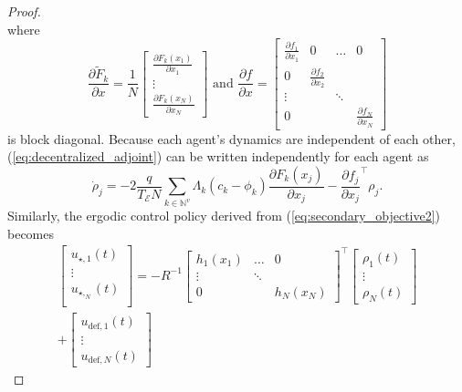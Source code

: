 \documentclass[letterpaper, 10 pt, conference]{ieeeconf}  %
\begin{document}
\begin{proof}
\begin{equation}
\end{equation}
where 
\begin{equation*}
\frac{\partial \tilde{F}_k}{\partial x} = \frac{1}{N} \begin{bmatrix}
\frac{\partial F_k (x_1)}{\partial x_1} \\
\vdots \\
\frac{\partial F_k(x_N)}{\partial x_N}
\end{bmatrix} 
\text{ and }
\frac{\partial f}{\partial x} =
\begin{bmatrix}
\frac{\partial f_1}{\partial x_1} & 0 & \ldots & 0 \\
0 & \frac{\partial f_{2}}{\partial x_{2}} \\
\vdots & & \ddots  & \\
0 &  & & \frac{\partial f_N}{\partial x_N}
\end{bmatrix}
\end{equation*}
is block diagonal.
Because each agent's dynamics are independent of each other, (\ref{eq:decentralized_adjoint}) can be written independently for each agent as
\begin{equation*}
\dot{\rho}_j = -2\frac{q}{T_\mathcal{E} N} \sum_{k \in \mathbb{N}^v} \Lambda_k (c_k - \phi_k) \frac{\partial F_k(x_j)}{\partial x_j} - \frac{\partial f_j}{\partial x_j}^\top \rho_j.
\end{equation*}
Similarly, the ergodic control policy derived from (\ref{eq:secondary_objective2}) becomes
{\small
\begin{multline} \label{eq:expanded_control}
\begin{bmatrix}
u_{\star,1} (t) \\
\vdots \\
u_{\star,_N}(t) \\
\end{bmatrix}
=
-R^{-1}  
 \begin{bmatrix}
h_1(x_1) & \ldots & 0\\
\vdots& \ddots & \\
0 & & h_N(x_N)
\end{bmatrix} ^\top
\begin{bmatrix}
\rho_1 (t) \\
\vdots \\
\rho_N(t)
\end{bmatrix}
 \\+
 \begin{bmatrix}
 u_{\text{def},1} (t) \\
 \vdots \\
 u_{\text{def},N}(t)

\end{bmatrix}
\end{multline}}
\end{proof}
\end{document}
